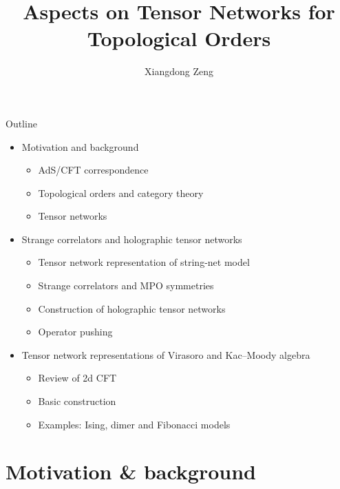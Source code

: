\documentclass{fdubeamer}
\title{Aspects on Tensor Networks for Topological Orders}
\author{Xiangdong Zeng}
\institute{Supervisor: Prof.\ Ling-Yan Hung}
\begin{document}
\maketitle

\begin{frame}{Outline}

\begin{itemize}
  \item Motivation and background

    \begin{itemize}
      \item AdS/CFT correspondence
      \item Topological orders and category theory
      \item Tensor networks
    \end{itemize}

  \item Strange correlators and holographic tensor networks

    \begin{itemize}
      \item Tensor network representation of string-net model
      \item Strange correlators and MPO symmetries
      \item Construction of holographic tensor networks
      \item Operator pushing
    \end{itemize}

  \item Tensor network representations of Virasoro and Kac--Moody algebra

    \begin{itemize}
      \item Review of 2d CFT
      \item Basic construction
      \item Examples: Ising, dimer and Fibonacci models
    \end{itemize}
\end{itemize}

\end{frame}

\section{Motivation \& background}
\end{document}
